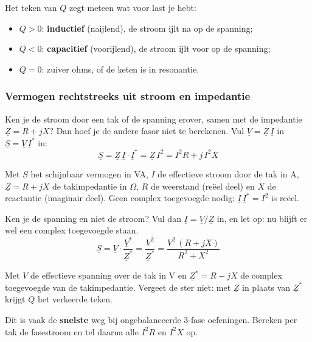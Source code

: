 \documentclass[a4paper,11pt]{article}
\begin{document}
Het teken van $Q$ zegt meteen wat voor last je hebt:
\begin{itemize}
    \item $Q > 0$: \textbf{inductief} (naijlend), de stroom ijlt na op de spanning;
    \item $Q < 0$: \textbf{capacitief} (voorijlend), de stroom ijlt voor op de spanning;
    \item $Q = 0$: zuiver ohms, of de keten is in resonantie.
\end{itemize}

\subsubsection{Vermogen rechtstreeks uit stroom en impedantie}

Ken je de stroom door een tak of de spanning erover, samen met de impedantie $\underline{Z} = R + jX$?
Dan hoef je de andere fasor niet te berekenen. Vul $\underline{V} = \underline{Z}\,\underline{I}$ in
$\underline{S} = \underline{V}\,\underline{I}^{*}$ in:
\[\underline{S} = \underline{Z}\,\underline{I}\cdot\underline{I}^{*} = \underline{Z}\,I^2
    = I^2 R + j\,I^2 X\]

{Met $\underline{S}$ het schijnbaar vermogen in VA, $I$ de effectieve stroom door de tak in A,
    $\underline{Z} = R + jX$ de takimpedantie in $\Omega$, $R$ de weerstand (re\"eel deel) en $X$ de
    reactantie (imaginair deel). Geen complex toegevoegde nodig: $\underline{I}\,\underline{I}^{*} = I^2$
    is re\"eel.}

Ken je de spanning en niet de stroom? Vul dan $\underline{I} = \underline{V}/\underline{Z}$ in, en let
op: nu blijft er wel een complex toegevoegde staan.
\[\underline{S} = \underline{V}\cdot\frac{\underline{V}^{*}}{\underline{Z}^{*}}
    = \frac{V^2}{\underline{Z}^{*}} = \frac{V^2\,(R + jX)}{R^2 + X^2}\]

{Met $V$ de effectieve spanning over de tak in V en $\underline{Z}^{*} = R - jX$ de complex
    toegevoegde van de takimpedantie. Vergeet de ster niet: met $\underline{Z}$ in plaats van
    $\underline{Z}^{*}$ krijgt $Q$ het verkeerde teken.}

Dit is vaak de \textbf{snelste} weg bij ongebalanceerde 3-fase oefeningen. Bereken per tak de
fasestroom en tel daarna alle $I^2R$ en $I^2X$ op.
\end{document}
